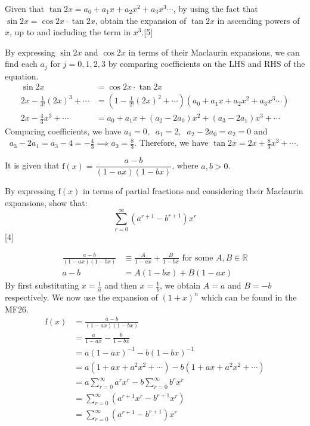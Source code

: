 \documentclass[12pt, a4 paper]{article}
\begin{document}
\begin{outline}[enumerate]
 \1 Given that \(\tan{2x}=a_{0}+a_{1}x+a_{2}x^2+a_{3}x^3\cdots \), by using the fact that \(\sin{2x}=\cos{2x}\cdot \tan{2x}\), obtain the expansion of \(\tan{2x}\) in ascending powers of \(x\), up to and including the term in \(x^3\).\hfill[5] %
 \begin{answer}
  By expressing \(\sin{2x}\) and \(\cos{2x}\) in terms of their Maclaurin expansions, we can find each \(a_{j}\) for \(j=0,1,2,3\) by comparing coefficients on the LHS and RHS of the equation.
  \begin{align*}
   \sin{2x}                       & =\cos{2x}\cdot \tan{2x}                                                 \\
   2x-\frac{1}{3!}{(2x)}^3+\cdots & = (1-\frac{1}{2!}{(2x)}^2+\cdots)(a_{0}+a_{1}x+a_{2}x^2+a_{3}x^3\cdots) \\
   2x-\frac{4}{3}x^3+\cdots       & = a_{0}+a_{1}x+(a_{2}-2a_{0})x^2+(a_{3}-2a_{1})x^3+\cdots
  \end{align*}
  Comparing coefficients, we have \(a_{0}=0,\; \; a_{1}=2,\; \; a_{2}-2a_{0}=a_{2}=0\) \; and \( \; \;a_{3}-2a_{1}=a_{3}-4=-\frac{4}{3}\implies a_{3}=\frac{8}{3}\). Therefore, we have \(\tan{2x}=2x+\frac{8}{3}x^3+\cdots \).
 \end{answer}

 \1 It is given that \(\textrm{f}(x)=\dfrac{a-b}{(1-ax)(1-bx)}\), where \(a,b>0\). %

 \2 By expressing \(\textrm{f}(x)\) in terms of partial fractions and considering their Maclaurin expansions, show that:
 \begin{equation*}
  \sum_{r=0}^{\infty}(a^{r+1}-b^{r+1})x^{r}
 \end{equation*}\hfill[4]
 \begin{answer}
  \begin{align*}
   \frac{a-b}{(1-ax)(1-bx)} & \equiv \frac{A}{1-ax} + \frac{B}{1-bx} \textrm{ for some \(A,B\in \mathbb{R}\)} \\
   a-b                      & = A(1-bx) + B(1-ax)
  \end{align*}
  By first substituting \(x=\frac{1}{a}\) and then \(x=\frac{1}{b}\), we obtain \(A=a\) and \(B=-b\) respectively. We now use the expansion of \({(1+x)}^n\) which can be found in the MF26.
  \begin{align*}
   \textrm{f}(x) & =\frac{a-b}{(1-ax)(1-bx)}                                         \\
                 & = \frac{a}{1-ax} - \frac{b}{1-bx}                                 \\
                 & = a{(1-ax)}^{-1} - b{(1-bx)}^{-1}                                 \\
                 & = a(1+ax+a^2x^2+\cdots) - b(1+ax+a^2x^2+\cdots)                   \\
                 & = a\sum_{r=0}^{\infty}{a^r}{x^r} - b\sum_{r=0}^{\infty}{b^r}{x^r} \\
                 & = \sum_{r=0}^{\infty}(a^{r+1}x^r - b^{r+1}x^r)                    \\
                 & = \sum_{r=0}^{\infty}(a^{r+1}-b^{r+1})x^r
  \end{align*}
 \end{answer}


\end{outline}
\end{document}
